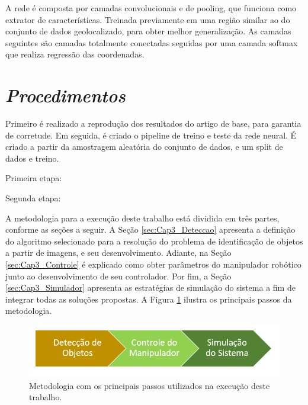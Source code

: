 A rede é composta por camadas convolucionais e de pooling, que funciona como extrator de características. Treinada previamente em uma região similar ao do conjunto de dados geolocalizado, para obter melhor generalização. As camadas seguintes são camadas totalmente conectadas seguidas por uma camada softmax que realiza regressão das coordenadas.

\section{\textit{Procedimentos}}\label{sec:Cap3_Procedimentos}

Primeiro é realizado a reprodução dos resultados do artigo de base, para garantia de corretude. 
Em seguida, é criado o pipeline de treino e teste da rede neural. É criado a partir da amostragem aleatória do conjunto de dados, e um split de dados e treino.

Primeira etapa:

Segunda etapa: %


A metodologia para a execução deste trabalho está dividida em três partes, conforme as seções a seguir. A Seção \ref{sec:Cap3_Deteccao} apresenta a definição do algoritmo selecionado para a resolução do problema de identificação de objetos a partir de imagens, e seu desenvolvimento. Adiante, na Seção \ref{sec:Cap3_Controle} é explicado como obter parâmetros do manipulador robótico junto ao desenvolvimento de seu controlador. Por fim, a Seção \ref{sec:Cap3_Simulador} apresenta as estratégias de simulação do sistema a fim de integrar todas as soluções propostas. A Figura \ref{fig:metodologia} ilustra os principais passos da metodologia.

\begin{figure}[h!]
    \centering
    \includegraphics[width=.75\columnwidth]{Imagens/DiagramaMetodologia.PNG}
    \caption{Metodologia com os principais passos utilizados na execução deste trabalho.}
    \label{fig:metodologia}
\end{figure}

